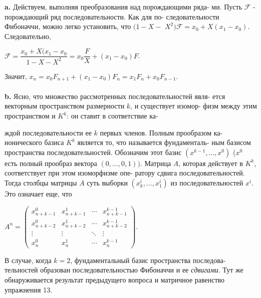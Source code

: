 \hspace*{15pt}\textbf{a.} Действуем, выполняя преобразования над порождающими ряда-\linebreak
ми. Пусть $\mathcal{F}$ - порождающий ряд последовательности. Как для по-\linebreak
следовательности Фибоначчи, можно легко установить, что $(1-X-$\linebreak
$X^2)\mathcal{F}=x_0+X(x_1-x_0)$. Следовательно,
\begin{center}
$\mathcal{F}=\dfrac{x_0+X(x_1-x_0}{1-X-X^2}=x_0\dfrac{F}{X}+(x_1-x_0)F$.
\end{center}
Значит, $x_n=x_0F_{n+1}+(x_1-x_0)F_n=x_1F_n+x_0F_{n-1}$.\\\\
\hspace*{15pt}\textbf{b.} Ясно, что множество рассмотренных последовательностей явля-\linebreak
ется векторным пространством размерности $k$, и существует изомор-\linebreak
физм между этим пространством и $K^k$: он ставит в соответствие ка-\linebreak
\newpage



\noindent
ждой последовательности ее $k$ первых членов. Полным прообразом ка-\linebreak
нонического базиса $K^k$ является то, что называется фундаменталь-\linebreak
ным базисом пространства последовательностей. Обозначим этот базис\linebreak
$(x^{k-1},...,x^0)$ ($x^0$ есть полный прообраз вектора $(0,...,0,1))$. Матрица\linebreak
$A$, которая действует в $K^k$, соответствует при этом изоморфизме опе-\linebreak
ратору сдвига последовательностей. Тогда столбцы матрицы $A$ суть\linebreak
выборки $(x_k^i,...,x_1^i)$ из последовательностей $x^i$. Это означает еще, что\linebreak
\begin{center}
$A^n=\begin{pmatrix}
x_{n+k-1}^0 & x_{n+k-1}^1 & \cdots & x_{n+k-1}^{k-1} \\
x_{n+k-2}^0 & x_{n+k-2}^1 & \cdots & x_{n+k-2}^{k-1} \\         
\vdots & \vdots & \ddots & \vdots \\
x_n^0 & x_n^1 & \cdots & x_n^{k-1}
\end{pmatrix}$.
\end{center}
В случае, когда $k=2$, фундаментальный базис пространства последова-\linebreak
тельностей образован последовательностью Фибоначчи и ее \textit{сдвигами}.\linebreak
Тут же обнаруживается результат предыдущего вопроса и матричное\linebreak
равенство упражнения 13.\\

